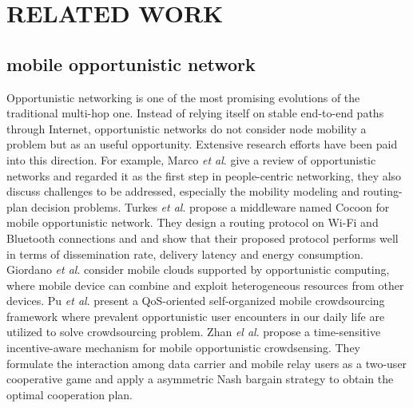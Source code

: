 \documentclass[journal]{IEEEtran}
\begin{document}





\section{RELATED WORK}

\subsection{mobile opportunistic network}
Opportunistic networking is one of the most promising evolutions of the traditional multi-hop one. 
Instead of relying itself on stable end-to-end paths through Internet, opportunistic networks do not consider node mobility a problem but as an useful opportunity. 
Extensive research efforts have been paid into this direction. For example, Marco \emph{et al}. \cite{Conti2014} give a review of opportunistic networks and regarded it as the first step in people-centric networking, they also discuss challenges to be addressed, especially the mobility modeling and routing-plan decision problems.
Turkes \emph{et al}. \cite{turkes2016cocoon} propose a middleware named Cocoon for mobile opportunistic network. They design a routing protocol on Wi-Fi and Bluetooth connections and and show that their proposed protocol performs well in terms of dissemination rate, delivery latency and energy consumption.
Giordano \emph{et al}. \cite{giordano2011human} consider mobile clouds supported by opportunistic computing, where mobile device can combine and exploit heterogeneous resources from other devices.
Pu \emph{et al}. \cite{Pu2017crowd} present a QoS-oriented self-organized mobile crowdsourcing framework where prevalent opportunistic user encounters in our daily life are utilized to solve crowdsourcing problem.
Zhan \emph{el al}. \cite{zhan2017time} propose a time-sensitive incentive-aware mechanism for mobile opportunistic crowdsensing. They formulate the interaction among data carrier and mobile relay users as a two-user cooperative game and apply a asymmetric Nash bargain strategy to obtain the optimal cooperation plan.
\end{document}
